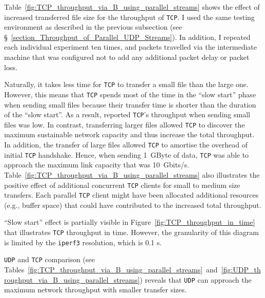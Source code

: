 \documentclass[12pt,a4paper]{report}
\begin{document}
Table~\ref{fig:TCP_throughput_via_B_using_parallel_streams} shows the effect of increased transferred file size for the throughput of \texttt{TCP}.
I used the same testing environment as described in the previous subsection (see \S~\ref{section_Throughput_of_Parallel_UDP_Streams}).
In addition, I repeated each individual experiment ten times, and packets travelled via the intermediate machine that was configured not to add any additional packet delay or packet loss.

Naturally, it takes less time for \texttt{TCP} to transfer a small file than the large one.
However, this means that \texttt{TCP} spends most of the time in the \enquote{slow start} phase when sending small files because their transfer time is shorter than the duration of the \enquote{slow start}.
As a result, reported \texttt{TCP}'s throughput when sending small files was low.
In contrast, transferring larger files allowed \texttt{TCP} to discover the maximum sustainable network capacity and thus increase the total throughput.
In addition, the transfer of large files allowed \texttt{TCP} to amortise the overhead of initial \texttt{TCP} handshake.
Hence, when sending 1~GByte of data, \texttt{TCP} was able to approach the maximum link capacity that was 10~Gbits/s.
Table~\ref{fig:TCP_throughput_via_B_using_parallel_streams} also illustrates the positive effect of additional concurrent \texttt{TCP} clients for small to medium size transfers.
Each parallel \texttt{TCP} client might have been allocated additional resources (e.g., buffer space) that could have contributed to the increased total throughput.


\enquote{Slow start} effect is partially visible in Figure~\ref{fig:TCP_throughput_in_time} that illustrates \texttt{TCP} throughput in time.
However, the granularity of this diagram is limited by the \texttt{iperf3} resolution, which is 0.1 s.

\texttt{UDP} and \texttt{TCP} comparison (see Tables~\ref{fig:TCP_throughput_via_B_using_parallel_streams}~and~\ref{fig:UDP_throughput_via_B_using_parallel_streams}) reveals that \texttt{UDP} can approach the maximum network throughput with smaller transfer sizes.
\end{document}
